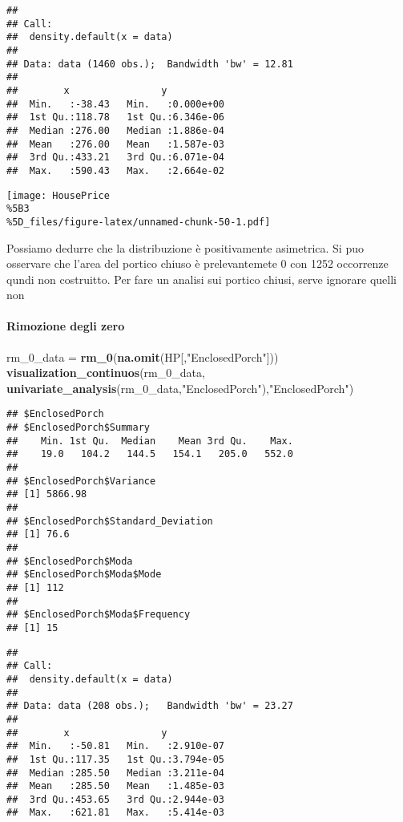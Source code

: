 \documentclass[
]{article}
\newenvironment{Shaded}{\begin{snugshade}}{\end{snugshade}}
\newcommand{\FunctionTok}[1]{\textcolor[rgb]{0.13,0.29,0.53}{\textbf{#1}}}
\newcommand{\NormalTok}[1]{#1}
\newcommand{\OtherTok}[1]{\textcolor[rgb]{0.56,0.35,0.01}{#1}}
\newcommand{\StringTok}[1]{\textcolor[rgb]{0.31,0.60,0.02}{#1}}
\begin{document}
\begin{verbatim}
## 
## Call:
##  density.default(x = data)
## 
## Data: data (1460 obs.);  Bandwidth 'bw' = 12.81
## 
##        x                y            
##  Min.   :-38.43   Min.   :0.000e+00  
##  1st Qu.:118.78   1st Qu.:6.346e-06  
##  Median :276.00   Median :1.886e-04  
##  Mean   :276.00   Mean   :1.587e-03  
##  3rd Qu.:433.21   3rd Qu.:6.071e-04  
##  Max.   :590.43   Max.   :2.664e-02
\end{verbatim}

\texttt{[image: HousePrice\\\%5B3\\\%5D\_files/figure-latex/unnamed-chunk-50-1.pdf]}

Possiamo dedurre che la distribuzione è positivamente asimetrica. Si puo
osservare che l'area del portico chiuso è prelevantemete 0 con 1252
occorrenze qundi non costruitto. Per fare un analisi sui portico chiusi,
serve ignorare quelli non

\paragraph{Rimozione degli zero}\label{rimozione-degli-zero-10}

\begin{Shaded}
\begin{Highlighting}[]
\NormalTok{rm\_0\_data }\OtherTok{=} \FunctionTok{rm\_0}\NormalTok{(}\FunctionTok{na.omit}\NormalTok{(HP[,}\StringTok{"EnclosedPorch"}\NormalTok{]))}
\FunctionTok{visualization\_continuos}\NormalTok{(rm\_0\_data, }\FunctionTok{univariate\_analysis}\NormalTok{(rm\_0\_data,}\StringTok{"EnclosedPorch"}\NormalTok{),}\StringTok{"EnclosedPorch"}\NormalTok{)}
\end{Highlighting}
\end{Shaded}

\begin{verbatim}
## $EnclosedPorch
## $EnclosedPorch$Summary
##    Min. 1st Qu.  Median    Mean 3rd Qu.    Max. 
##    19.0   104.2   144.5   154.1   205.0   552.0 
## 
## $EnclosedPorch$Variance
## [1] 5866.98
## 
## $EnclosedPorch$Standard_Deviation
## [1] 76.6
## 
## $EnclosedPorch$Moda
## $EnclosedPorch$Moda$Mode
## [1] 112
## 
## $EnclosedPorch$Moda$Frequency
## [1] 15
\end{verbatim}

\begin{verbatim}
## 
## Call:
##  density.default(x = data)
## 
## Data: data (208 obs.);   Bandwidth 'bw' = 23.27
## 
##        x                y            
##  Min.   :-50.81   Min.   :2.910e-07  
##  1st Qu.:117.35   1st Qu.:3.794e-05  
##  Median :285.50   Median :3.211e-04  
##  Mean   :285.50   Mean   :1.485e-03  
##  3rd Qu.:453.65   3rd Qu.:2.944e-03  
##  Max.   :621.81   Max.   :5.414e-03
\end{verbatim}
\end{document}
